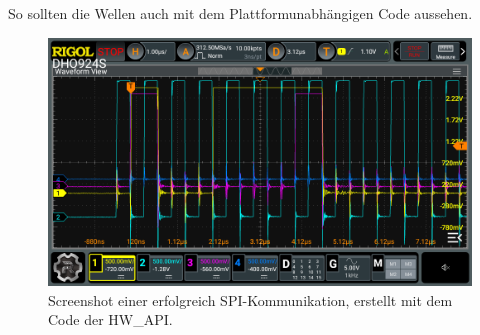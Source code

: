 So sollten die Wellen auch mit dem Plattformunabhängigen Code aussehen.

\begin{figure}[H]
	\includegraphics[width=\textwidth]{Pics/spi_signal_test.png}
	\caption{Screenshot einer erfolgreich SPI-Kommunikation, erstellt mit dem Code der HW\_API.}
\end{figure}


%
%

